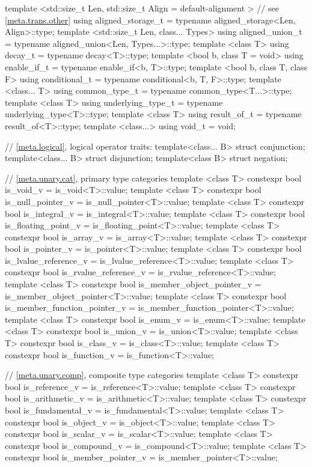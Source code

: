 \begin{codeblock}
{  template <std::size_t Len,
            std::size_t Align = default-alignment > // see \ref{meta.trans.other}
    using aligned_storage_t = typename aligned_storage<Len, Align>::type;
  template <std::size_t Len, class... Types>
    using aligned_union_t   = typename aligned_union<Len, Types...>::type;
  template <class T>
    using decay_t           = typename decay<T>::type;
  template <bool b, class T = void>
    using enable_if_t       = typename enable_if<b, T>::type;
  template <bool b, class T, class F>
    using conditional_t     = typename conditional<b, T, F>::type;
  template <class... T>
    using common_type_t     = typename common_type<T...>::type;
  template <class T>
    using underlying_type_t = typename underlying_type<T>::type;
  template <class T>
    using result_of_t       = typename result_of<T>::type;  
  template <class...>
    using void_t            = void;

  // \ref{meta.logical}, logical operator traits:
  template<class... B> struct conjunction;
  template<class... B> struct disjunction;
  template<class B> struct negation;

  // \ref{meta.unary.cat}, primary type categories
  template <class T> constexpr bool is_void_v
    = is_void<T>::value;
  template <class T> constexpr bool is_null_pointer_v
    = is_null_pointer<T>::value;
  template <class T> constexpr bool is_integral_v
    = is_integral<T>::value;
  template <class T> constexpr bool is_floating_point_v
    = is_floating_point<T>::value;
  template <class T> constexpr bool is_array_v
    = is_array<T>::value;
  template <class T> constexpr bool is_pointer_v
    = is_pointer<T>::value;
  template <class T> constexpr bool is_lvalue_reference_v
    = is_lvalue_reference<T>::value;
  template <class T> constexpr bool is_rvalue_reference_v
    = is_rvalue_reference<T>::value;
  template <class T> constexpr bool is_member_object_pointer_v
    = is_member_object_pointer<T>::value;
  template <class T> constexpr bool is_member_function_pointer_v
    = is_member_function_pointer<T>::value;
  template <class T> constexpr bool is_enum_v
    = is_enum<T>::value;
  template <class T> constexpr bool is_union_v
    = is_union<T>::value;
  template <class T> constexpr bool is_class_v
    = is_class<T>::value;
  template <class T> constexpr bool is_function_v
    = is_function<T>::value;

  // \ref{meta.unary.comp}, composite type categories
  template <class T> constexpr bool is_reference_v
    = is_reference<T>::value;
  template <class T> constexpr bool is_arithmetic_v
    = is_arithmetic<T>::value;
  template <class T> constexpr bool is_fundamental_v
    = is_fundamental<T>::value;
  template <class T> constexpr bool is_object_v
    = is_object<T>::value;
  template <class T> constexpr bool is_scalar_v
    = is_scalar<T>::value;
  template <class T> constexpr bool is_compound_v
    = is_compound<T>::value;
  template <class T> constexpr bool is_member_pointer_v
    = is_member_pointer<T>::value;

}
\end{codeblock}
